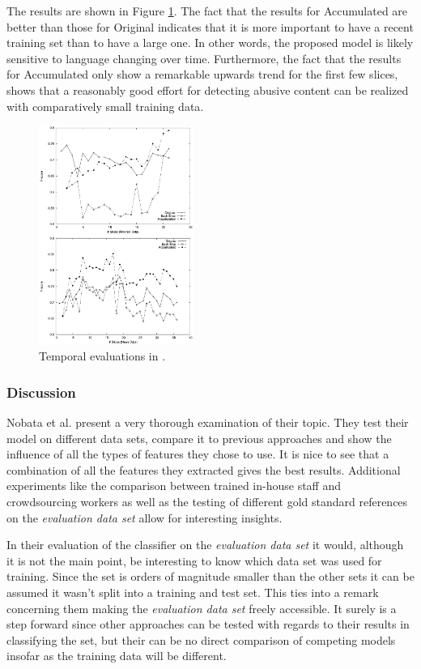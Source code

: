 \documentclass{proseminar}
\begin{document}
The results are shown in Figure \ref{fig:yahoo_temporal}. The fact that the results for Accumulated are better than those for Original indicates that it is more important to have a recent training set than to have a large one. In other words, the proposed model is likely sensitive to language changing over time. Furthermore, the fact that the results for Accumulated only show a remarkable upwards trend for the first few slices, shows that a reasonably good effort for detecting abusive content can be realized with comparatively small training data.

\begin{figure}
\centering
\includegraphics[width=0.45\textwidth]{img/yahoo_temporal}
\caption{Temporal evaluations in \cite{Yahoo:2016}.}
\label{fig:yahoo_temporal}
\end{figure}

\subsubsection{Discussion}
Nobata et al. present a very thorough examination of their topic. They test their model on different data sets, compare it to previous approaches and show the influence of all the types of features they chose to use. It is nice to see that a combination of all the features they extracted gives the best results. Additional experiments like the comparison between trained in-house staff and crowdsourcing workers as well as the testing of different gold standard references on the \emph{evaluation data set} allow for interesting insights.

In their evaluation of the classifier on the \emph{evaluation data set} it would, although it is not the main point, be interesting to know which data set was used for training. Since the set is orders of magnitude smaller than the other sets it can be assumed it wasn't split into a training and test set. This ties into a remark concerning them making the \emph{evaluation data set} freely accessible. It surely is a step forward since other approaches can be tested with regards to their results in classifying the set, but their can be no direct comparison of competing models insofar as the training data will be different.
\end{document}
